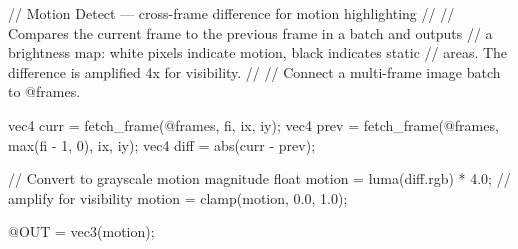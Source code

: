 // Motion Detect — cross-frame difference for motion highlighting
//
// Compares the current frame to the previous frame in a batch and outputs
// a brightness map: white pixels indicate motion, black indicates static
// areas. The difference is amplified 4x for visibility.
//
// Connect a multi-frame image batch to @frames.

vec4 curr = fetch_frame(@frames, fi, ix, iy);
vec4 prev = fetch_frame(@frames, max(fi - 1, 0), ix, iy);
vec4 diff = abs(curr - prev);

// Convert to grayscale motion magnitude
float motion = luma(diff.rgb) * 4.0;  // amplify for visibility
motion = clamp(motion, 0.0, 1.0);

@OUT = vec3(motion);

